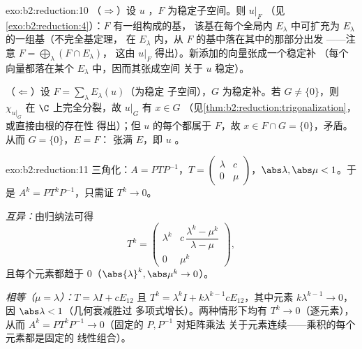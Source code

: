 \begin{solution}{exo:b2:reduction:10}
（$\Rightarrow$）设 $u$ ，$F$ 为稳定子空间。则
$u|_F$ （见\cref{exo:b2:reduction:4}）：$F$ 有一组构成的基，
该基在每个全局内
$E_\lambda$ 中可扩充为 $E_\lambda$ 的一组基（不完全基定理，
在 $E_\lambda$ 内，从 $F$ 的基中落在其中的那部分出发
——注意 $F = \bigoplus_\lambda (F \cap E_\lambda)$，
这由 $u|_F$ 得出）。新添加的向量张成一个稳定补
（每个向量都落在某个 $E_\lambda$ 中，因而其张成空间
关于 $u$ 稳定）。

（$\Leftarrow$）设 $F = \sum_\lambda E_\lambda(u)$（为稳定
子空间），$G$ 为稳定补。若 $G \neq \{0\}$，则 $\chi_{u|_G}$
在 $\C$ 上完全分裂，故 $u|_G$ 有 $x \in G$
（见\cref{thm:b2:reduction:trigonalization}，或直接由根的存在性
得出）；但 $u$ 的每个都属于 $F$，故 $x \in F
\cap G = \{0\}$，矛盾。从而 $G = \{0\}$，$E = F$：
张满 $E$，即 $u$ 。
\end{solution}

\begin{solution}{exo:b2:reduction:11}
三角化：$A = PTP^{-1}$，$T = \begin{pmatrix} \lambda & c\\ 0 &
\mu\end{pmatrix}$，$\abs\lambda, \abs\mu < 1$。于是 $A^k =
PT^kP^{-1}$，只需证 $T^k \to 0$。

\emph{互异：}由归纳法可得
\[
T^k = \begin{pmatrix}
\lambda^k & c\,\dfrac{\lambda^k - \mu^k}{\lambda - \mu}\\[4pt]
0 & \mu^k
\end{pmatrix},
\]
且每个元素都趋于 $0$（$\abs{\lambda}^k, \abs\mu^k \to 0$）。

\emph{相等（$\mu = \lambda$）：}$T = \lambda I + cE_{12}$
且 $T^k = \lambda^k I + k\lambda^{k-1}cE_{12}$，其中元素
$k\lambda^{k-1} \to 0$，因 $\abs\lambda < 1$（几何衰减胜过
多项式增长）。两种情形下均有 $T^k \to 0$（逐元素），从而 $A^k =
PT^kP^{-1} \to 0$（固定的 $P, P^{-1}$ 对矩阵乘法
关于元素连续——乘积的每个元素都是固定的
线性组合）。
\end{solution}

